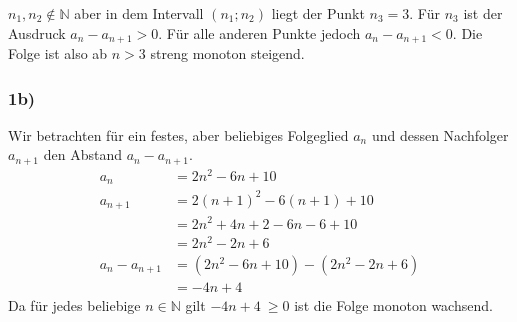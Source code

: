 $\displaystyle n_{1} ,n_{2} \notin \mathbb{N}$ aber in dem Intervall $\displaystyle ( n_{1} ;n_{2})$ liegt der Punkt $\displaystyle n_{3} =3$. Für $\displaystyle n_{3}$ ist der Ausdruck $\displaystyle a_{n} -a_{n+1}  >0$. Für alle anderen Punkte jedoch $\displaystyle a_{n} -a_{n+1} < 0$. Die Folge ist also ab $\displaystyle n >3$ streng monoton steigend.

\subsubsection*{1b)}

Wir betrachten für ein festes, aber beliebiges Folgeglied $\displaystyle a_{n}$ und dessen Nachfolger $\displaystyle a_{n+1}$ den Abstand $\displaystyle a_{n} -a_{n+1}$.
\begin{align*}
  a_{n} & =2n^{2} -6n+10\\
  a_{n+1} & =2( n+1)^{2} -6( n+1) +10\\
  & =2n^{2} +4n+2-6n-6+10\\
  & =2n^{2} -2n+6\\
  a_{n} -a_{n+1} & =\left( 2n^{2} -6n+10\right) -\left( 2n^{2} -2n+6\right)\\
  & =-4n+4
\end{align*}
Da für jedes beliebige $\displaystyle n\in \mathbb{N}$ gilt $\displaystyle -4n+4\ \geq 0$ ist die Folge monoton wachsend.